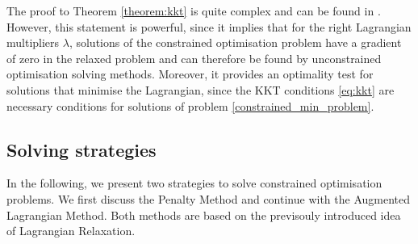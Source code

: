 The proof to Theorem \ref{theorem:kkt} is quite complex and can be found in \cite{NoceWrig06}. However, this statement is powerful, since it implies that for the right Lagrangian multipliers $\lambda$, solutions of the constrained optimisation problem have a gradient of zero in the relaxed problem and can therefore be found by unconstrained optimisation solving methods. Moreover, it provides an optimality test for solutions that minimise the Lagrangian, since the KKT conditions \eqref{eq:kkt} are necessary conditions for solutions of problem \eqref{constrained_min_problem}.\\




\subsection{Solving strategies}
In the following, we present two strategies to solve constrained optimisation problems. We first discuss the Penalty Method and continue with the Augmented Lagrangian Method. Both methods are based on the previsouly introduced idea of Lagrangian Relaxation.
